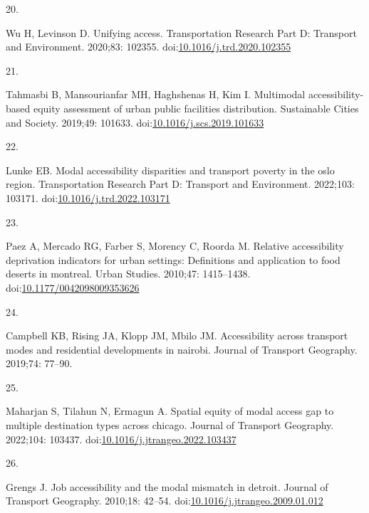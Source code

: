 \documentclass[10pt,letterpaper]{article}
\newlength{\cslhangindent}
\newlength{\csllabelwidth}
\newlength{\cslentryspacingunit} %
\newenvironment{CSLReferences}[2] %
 {%
  \setlength{\parindent}{0pt}
  \ifodd #1
  \let\oldpar\par
  \def\par{\hangindent=\cslhangindent\oldpar}
  \fi
  \setlength{\parskip}{#2\cslentryspacingunit}
 }%
 {}
\newcommand{\CSLLeftMargin}[1]{\parbox[t]{\csllabelwidth}{#1}}
\newcommand{\CSLRightInline}[1]{\parbox[t]{\linewidth - \csllabelwidth}{#1}\break}
\begin{document}
\begin{CSLReferences}{0}{0}
\leavevmode{}%
\CSLLeftMargin{20. }%
\CSLRightInline{Wu H, Levinson D. Unifying access. Transportation
Research Part D: Transport and Environment. 2020;83: 102355.
doi:\href{https://doi.org/10.1016/j.trd.2020.102355}{10.1016/j.trd.2020.102355}}

\leavevmode{}%
\CSLLeftMargin{21. }%
\CSLRightInline{Tahmasbi B, Mansourianfar MH, Haghshenas H, Kim I.
Multimodal accessibility-based equity assessment of urban public
facilities distribution. Sustainable Cities and Society. 2019;49:
101633.
doi:\href{https://doi.org/10.1016/j.scs.2019.101633}{10.1016/j.scs.2019.101633}}

\leavevmode{}%
\CSLLeftMargin{22. }%
\CSLRightInline{Lunke EB. Modal accessibility disparities and transport
poverty in the oslo region. Transportation Research Part D: Transport
and Environment. 2022;103: 103171.
doi:\href{https://doi.org/10.1016/j.trd.2022.103171}{10.1016/j.trd.2022.103171}}

\leavevmode{}%
\CSLLeftMargin{23. }%
\CSLRightInline{Paez A, Mercado RG, Farber S, Morency C, Roorda M.
Relative accessibility deprivation indicators for urban settings:
Definitions and application to food deserts in montreal. Urban Studies.
2010;47: 1415--1438.
doi:\href{https://doi.org/10.1177/0042098009353626}{10.1177/0042098009353626}}

\leavevmode{}%
\CSLLeftMargin{24. }%
\CSLRightInline{Campbell KB, Rising JA, Klopp JM, Mbilo JM.
Accessibility across transport modes and residential developments in
nairobi. Journal of Transport Geography. 2019;74: 77--90. }

\leavevmode{}%
\CSLLeftMargin{25. }%
\CSLRightInline{Maharjan S, Tilahun N, Ermagun A. Spatial equity of
modal access gap to multiple destination types across chicago. Journal
of Transport Geography. 2022;104: 103437.
doi:\href{https://doi.org/10.1016/j.jtrangeo.2022.103437}{10.1016/j.jtrangeo.2022.103437}}

\leavevmode{}%
\CSLLeftMargin{26. }%
\CSLRightInline{Grengs J. Job accessibility and the modal mismatch in
detroit. Journal of Transport Geography. 2010;18: 42--54.
doi:\href{https://doi.org/10.1016/j.jtrangeo.2009.01.012}{10.1016/j.jtrangeo.2009.01.012}}


\end{CSLReferences}
\end{document}
